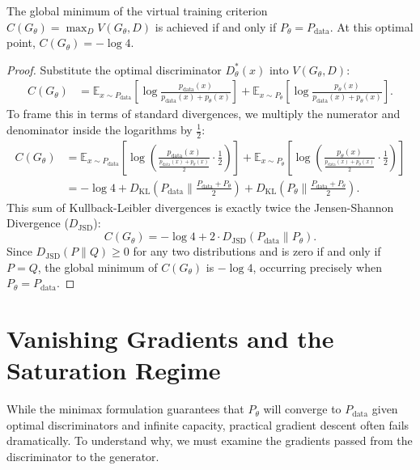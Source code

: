 \begin{theorem}
\label{thm:global_g}
The global minimum of the virtual training criterion $C(G_\theta) = \max_{D} V(G_\theta, D)$ is achieved if and only if $P_\theta = P_{\text{data}}$. At this optimal point, $C(G_\theta) = -\log 4$.
\end{theorem}

\begin{proof}
Substitute the optimal discriminator $D^*_\theta(x)$ into $V(G_\theta, D)$:
\begin{align*}
    C(G_\theta) &= \mathbb{E}_{x \sim P_{\text{data}}} \left[ \log \frac{p_{\text{data}}(x)}{p_{\text{data}}(x) + p_\theta(x)} \right] + \mathbb{E}_{x \sim P_\theta} \left[ \log \frac{p_\theta(x)}{p_{\text{data}}(x) + p_\theta(x)} \right].
\end{align*}
To frame this in terms of standard divergences, we multiply the numerator and denominator inside the logarithms by $\frac{1}{2}$:
\begin{align*}
    C(G_\theta) &= \mathbb{E}_{x \sim P_{\text{data}}} \left[ \log \left( \frac{p_{\text{data}}(x)}{\frac{p_{\text{data}}(x) + p_\theta(x)}{2}} \cdot \frac{1}{2} \right) \right] + \mathbb{E}_{x \sim P_\theta} \left[ \log \left( \frac{p_\theta(x)}{\frac{p_{\text{data}}(x) + p_\theta(x)}{2}} \cdot \frac{1}{2} \right) \right] \\
    &= -\log 4 + D_{\text{KL}}\left(P_{\text{data}} \parallel \frac{P_{\text{data}} + P_\theta}{2}\right) + D_{\text{KL}}\left(P_\theta \parallel \frac{P_{\text{data}} + P_\theta}{2}\right).
\end{align*}
This sum of Kullback-Leibler divergences is exactly twice the Jensen-Shannon Divergence ($D_{\text{JSD}}$):
\begin{equation}
    C(G_\theta) = -\log 4 + 2 \cdot D_{\text{JSD}}(P_{\text{data}} \parallel P_\theta).
\end{equation}
Since $D_{\text{JSD}}(P \parallel Q) \ge 0$ for any two distributions and is zero if and only if $P = Q$, the global minimum of $C(G_\theta)$ is $-\log 4$, occurring precisely when $P_\theta = P_{\text{data}}$.
\end{proof}

\section{Vanishing Gradients and the Saturation Regime}

While the minimax formulation guarantees that $P_\theta$ will converge to $P_{\text{data}}$ given optimal discriminators and infinite capacity, practical gradient descent often fails dramatically. To understand why, we must examine the gradients passed from the discriminator to the generator.

